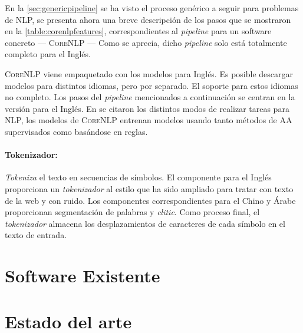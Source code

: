 En la \autoref{sec:genericpipeline} se ha visto el proceso genérico a seguir
para problemas de \ac{NLP}, se presenta ahora una breve descripción de
los pasos que se mostraron en la \autoref{table:corenlpfeatures},
correspondientes al \emph{pipeline} para un software concreto ---
\textsc{CoreNLP} \cite{Manning2014} --- Como se aprecia, dicho \emph{pipeline}
solo está totalmente completo para el Inglés.

\textsc{CoreNLP} viene empaquetado con los modelos para Inglés. Es posible
descargar modelos para distintos idiomas, pero por separado. El soporte para
estos idiomas no completo. Los pasos del \emph{pipeline} mencionados a
continuación se centran en la versión para el Inglés. En
 se citaron los distintos modos de realizar tareas para
\ac{NLP}, los modelos de \textsc{CoreNLP} entrenan modelos usando tanto métodos
de \ac{AA} supervisados como basándose en reglas.

\paragraph{Tokenizador:} \emph{Tokeniza} el texto en secuencias de símbolos. El
componente para el Inglés proporciona un \emph{tokenizador} al estilo
 que ha sido ampliado para tratar con texto de la web y
con ruido. Los componentes correspondientes para el Chino y Árabe proporcionan
segmentación de palabras y \emph{clitic}. Como proceso final, el
\emph{tokenizador} almacena los desplazamientos de caracteres de cada símbolo en
el texto de entrada.

\section{Software Existente}
\label{sec:nlpsoftware}


\section{Estado del arte}
\label{sec:stateoftheart}

